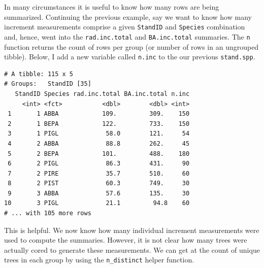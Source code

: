 \documentclass[]{krantz}
\makeatletter
\newenvironment{Shaded}{\begin{snugshade}}{\end{snugshade}}
\newcommand{\DataTypeTok}[1]{\textcolor[rgb]{0.27,0.27,0.27}{#1}}
\newcommand{\KeywordTok}[1]{\textcolor[rgb]{0.27,0.27,0.27}{\textbf{#1}}}
\newcommand{\NormalTok}[1]{#1}
\newcommand{\OperatorTok}[1]{\textcolor[rgb]{0.43,0.43,0.43}{\textbf{#1}}}
\newcommand{\StringTok}[1]{\textcolor[rgb]{0.5,0.5,0.5}{#1}}
\newenvironment{kframe}{%
\medskip{}
\setlength{\fboxsep}{.8em}
 \def\at@end@of@kframe{}%
 \ifinner\ifhmode%
  \def\at@end@of@kframe{\end{minipage}}%
  \begin{minipage}{\columnwidth}%
 \fi\fi%
 \def\FrameCommand##1{\hskip\@totalleftmargin \hskip-\fboxsep
 \colorbox{shadecolor}{##1}\hskip-\fboxsep
     \hskip-\linewidth \hskip-\@totalleftmargin \hskip\columnwidth}%
 \MakeFramed {\advance\hsize-\width
   \@totalleftmargin\z@ \linewidth\hsize
   \@setminipage}}%
 {\par\unskip\endMakeFramed%
 \at@end@of@kframe}
\renewenvironment{Shaded}{\begin{kframe}}{\end{kframe}}
\makeatother
\begin{document}
In many circumstances it is useful to know how many rows are being summarized. Continuing the previous example, say we want to know how many increment measurements comprise a given \texttt{StandID} and \texttt{Species} combination and, hence, went into the \texttt{rad.inc.total} and \texttt{BA.inc.total} summaries. The \texttt{n} function returns the count of rows per group (or number of rows in an ungrouped tibble). Below, I add a new variable called \texttt{n.inc} to the our previous \texttt{stand.spp}.

\begin{Shaded}
\end{Shaded}

\begin{verbatim}
# A tibble: 115 x 5
# Groups:   StandID [35]
   StandID Species rad.inc.total BA.inc.total n.inc
     <int> <fct>           <dbl>        <dbl> <int>
 1       1 ABBA            109.         309.    150
 2       1 BEPA            122.         733.    150
 3       1 PIGL             58.0        121.     54
 4       2 ABBA             88.8        262.     45
 5       2 BEPA            101.         488.    180
 6       2 PIGL             86.3        431.     90
 7       2 PIRE             35.7        510.     60
 8       2 PIST             60.3        749.     30
 9       3 ABBA             57.6        135.     30
10       3 PIGL             21.1         94.8    60
# ... with 105 more rows
\end{verbatim}

This is helpful. We now know how many individual increment measurements were used to compute the summaries. However, it is not clear how many trees were actually cored to generate these measurements. We can get at the count of unique trees in each group by using the \texttt{n\_distinct} helper function.
\end{document}
